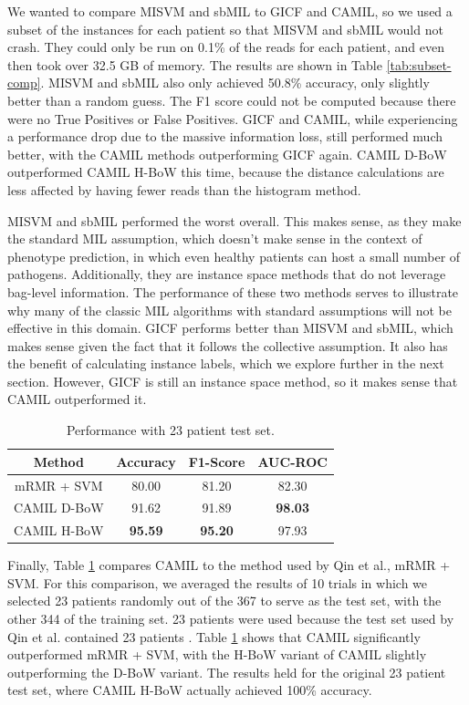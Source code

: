 We wanted to compare MISVM and sbMIL to GICF and CAMIL, so we used a subset of the instances for each patient so that MISVM and sbMIL would not crash. They could only be run on 0.1\% of the reads for each patient, and even then took over 32.5 GB of memory. The results are shown in Table \ref{tab:subset-comp}. MISVM and sbMIL also only achieved 50.8\% accuracy, only slightly better than a random guess. The F1 score could not be computed because there were no True Positives or False Positives. GICF and CAMIL, while experiencing a performance drop due to the massive information loss, still performed much better, with the CAMIL methods outperforming GICF again. CAMIL D-BoW outperformed CAMIL H-BoW this time, because the distance calculations are less affected by having fewer reads than the histogram method.

MISVM and sbMIL performed the worst overall. This makes sense, as they make the standard MIL assumption, which doesn't make sense in the context of phenotype prediction, in which even healthy patients can host a small number of pathogens. Additionally, they are instance space methods that do not leverage bag-level information. The performance of these two methods serves to illustrate why many of the classic MIL algorithms with standard assumptions will not be effective in this domain. GICF performs better than MISVM and sbMIL, which makes sense given the fact that it follows the collective assumption. It also has the benefit of calculating instance labels, which we explore further in the next section. However, GICF is still an instance space method, so it makes sense that CAMIL outperformed it.

\begin{table}[h]
\begin{center}
\caption{Performance with 23 patient test set.} 
\label{tab:test-comp}
\begin{tabular}{|c|ccc|}\hline
Method & Accuracy & F1-Score & AUC-ROC\\\hline
mRMR + SVM & 80.00 & 81.20 & 82.30\\\hline 
CAMIL D-BoW & 91.62 & 91.89 & \bf{98.03}\\\hline
CAMIL H-BoW & \bf{95.59} & \bf{95.20} & 97.93\\\hline
\end{tabular}
\end{center}
\end{table}

Finally, Table \ref{tab:test-comp} compares CAMIL to the method used by Qin et al., mRMR + SVM. For this comparison, we averaged the results of 10 trials in which we selected 23 patients randomly out of the 367 to serve as the test set, with the other 344 of the training set. 23 patients were used because the test set used by Qin et al. contained 23 patients \cite{qin041012}. Table \ref{tab:test-comp} shows that CAMIL significantly outperformed mRMR + SVM, with the H-BoW variant of CAMIL slightly outperforming the D-BoW variant. The results held for the original 23 patient test set, where CAMIL H-BoW actually achieved 100\% accuracy.


